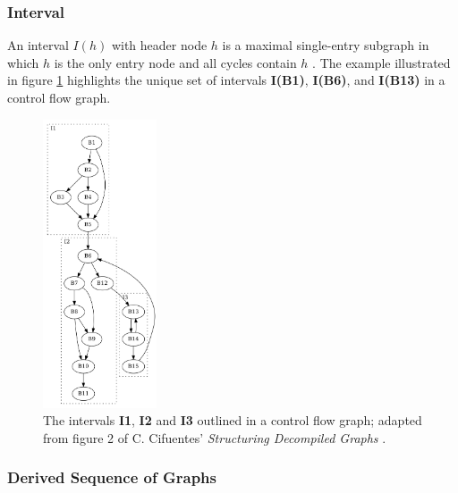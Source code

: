 

\subsubsection{Interval}

An interval $I(h)$ with header node $h$ is a maximal single-entry subgraph in which $h$ is the only entry node and all cycles contain $h$ \cite{structuring_algorithm_for_decompilation}. The example illustrated in figure \ref{fig:interval} highlights the unique set of intervals \textbf{I(B1)}, \textbf{I(B6)}, and \textbf{I(B13)} in a control flow graph.

\begin{figure}[htbp]
	\centering
	\includegraphics[width=0.3\textwidth]{inc/appendices/vocabulary/interval.png}
	\caption{The intervals \textbf{I1}, \textbf{I2} and \textbf{I3} outlined in a control flow graph; adapted from figure 2 of C. Cifuentes' \textit{Structuring Decompiled Graphs} \cite{structuring_decompiled_graphs}.}
	\label{fig:interval}
\end{figure}


\subsubsection{Derived Sequence of Graphs}

